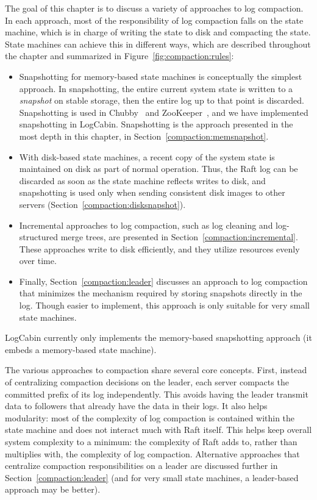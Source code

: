 The goal of this chapter is to discuss a variety of approaches to log
compaction. In each approach, most of the responsibility of log
compaction falls on the state machine, which is in charge of writing the
state to disk and compacting the state. State machines can achieve this
in different ways, which are described throughout the chapter and
summarized in Figure~\ref{fig:compaction:rules}:
%
\begin{itemize}
%
\item
%
Snapshotting for memory-based state machines is conceptually the
simplest approach. In snapshotting, the entire current system state is
written to a \emph{snapshot} on stable storage, then the entire log up
to that point is discarded. Snapshotting is used in
Chubby~\cite{Burrows:2006, Chandra:2007} and ZooKeeper~\cite{Hunt:2010},
and we have implemented snapshotting in LogCabin. Snapshotting is the
approach presented in the most depth in this chapter,
in Section~\ref{compaction:memsnapshot}.
%
\item
%
With disk-based state machines, a recent copy of the system state is
maintained on disk as part of normal operation. Thus, the Raft log can
be discarded as soon as the state machine reflects writes to disk,
and snapshotting is used only when sending consistent disk images to
other servers
(Section~\ref{compaction:disksnapshot}).
%
\item
%
Incremental approaches to log compaction, such as log cleaning and
log-structured merge trees, are presented in
Section~\ref{compaction:incremental}. These approaches write to disk
efficiently, and they utilize resources evenly over time.
%
\item
%
Finally, Section~\ref{compaction:leader} discusses an approach to log
compaction that minimizes the mechanism required by storing snapshots
directly in the log. Though easier to implement, this approach is only
suitable for very small state machines.
%
\end{itemize}
%
LogCabin currently only implements the memory-based snapshotting
approach (it embeds a memory-based state machine).

The various approaches to compaction share several core concepts. First,
instead of centralizing compaction decisions on the leader, each server
compacts the
committed prefix of its log independently. This avoids having the leader
transmit data to followers that already have the data in their logs. It also
helps modularity: most of the complexity of log compaction is
contained within the state machine and does not interact much with Raft
itself. This helps keep overall system complexity to a
minimum: the complexity of Raft adds to, rather than multiplies with,
the complexity of log compaction. Alternative approaches that centralize compaction
responsibilities on a leader are discussed further in
Section~\ref{compaction:leader} (and for very small state machines, a
leader-based approach may be better).

